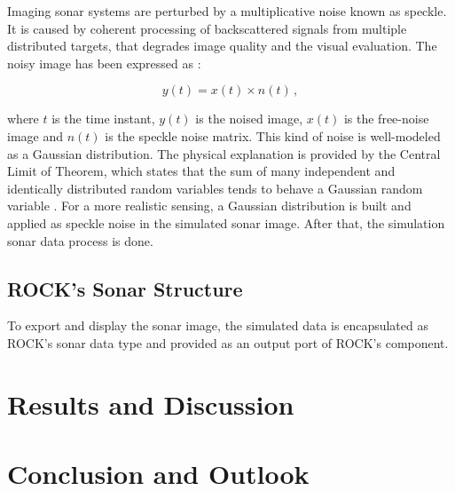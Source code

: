 \documentclass[final,5p,times]{elsarticle}
\begin{document}
Imaging sonar systems are perturbed by a multiplicative noise known as speckle. It is caused by coherent processing of backscattered signals from multiple distributed targets, that degrades image quality and the visual evaluation. The noisy image has been expressed as \cite{lee1980}:

\begin{equation}
\label{eq:2}
y(t) = x(t) \times n(t) \, ,
\end{equation}

where $t$ is the time instant, $y(t)$ is the noised image, $x(t)$ is the free-noise image and $n(t)$ is the speckle noise matrix. This kind of noise is well-modeled as a Gaussian distribution. The physical explanation is provided by the Central Limit of Theorem, which states that the sum of many independent and identically distributed random variables tends to behave a Gaussian random variable \cite{papoulis2002}. For a more realistic sensing, a Gaussian distribution is built and applied as speckle noise in the simulated sonar image. After that, the simulation sonar data process is done.

\subsection{ROCK's Sonar Structure}
\label{}

To export and display the sonar image, the simulated data is encapsulated as ROCK's sonar data type and provided as an output port of ROCK's component.



\section{Results and Discussion}
\label{}


\section{Conclusion and Outlook}
\label{}


\end{document}
